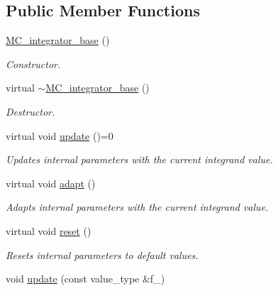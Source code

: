 \subsection*{Public Member Functions}
\begin{DoxyCompactItemize}
\item 
\hypertarget{a00370_a8d6ba84b704680c6eb4484df262da740}{}\hyperlink{a00370_a8d6ba84b704680c6eb4484df262da740}{M\+C\+\_\+integrator\+\_\+base} ()\label{a00370_a8d6ba84b704680c6eb4484df262da740}

\begin{DoxyCompactList}\small\item\em Constructor. \end{DoxyCompactList}\item 
\hypertarget{a00370_a579e858e0d7bb20cd8ce6b2070800a81}{}virtual \hyperlink{a00370_a579e858e0d7bb20cd8ce6b2070800a81}{$\sim$\+M\+C\+\_\+integrator\+\_\+base} ()\label{a00370_a579e858e0d7bb20cd8ce6b2070800a81}

\begin{DoxyCompactList}\small\item\em Destructor. \end{DoxyCompactList}\item 
\hypertarget{a00370_adce320174be43d256e68e344b1d87e7e}{}virtual void \hyperlink{a00370_adce320174be43d256e68e344b1d87e7e}{update} ()=0\label{a00370_adce320174be43d256e68e344b1d87e7e}

\begin{DoxyCompactList}\small\item\em Updates internal parameters with the current integrand value. \end{DoxyCompactList}\item 
\hypertarget{a00370_a09d91a0a6c6ac859b75cf252669b8624}{}virtual void \hyperlink{a00370_a09d91a0a6c6ac859b75cf252669b8624}{adapt} ()\label{a00370_a09d91a0a6c6ac859b75cf252669b8624}

\begin{DoxyCompactList}\small\item\em Adapts internal parameters with the current integrand value. \end{DoxyCompactList}\item 
\hypertarget{a00370_a003e7dad9599bf458c3cbe3d175b7e75}{}virtual void \hyperlink{a00370_a003e7dad9599bf458c3cbe3d175b7e75}{reset} ()\label{a00370_a003e7dad9599bf458c3cbe3d175b7e75}

\begin{DoxyCompactList}\small\item\em Resets internal parameters to default values. \end{DoxyCompactList}\item 
\hypertarget{a00370_a87512ef77196949ca32092f47030c4d5}{}void \hyperlink{a00370_a87512ef77196949ca32092f47030c4d5}{update} (const value\+\_\+type \&f\+\_\+)\label{a00370_a87512ef77196949ca32092f47030c4d5}


\end{DoxyCompactItemize}

